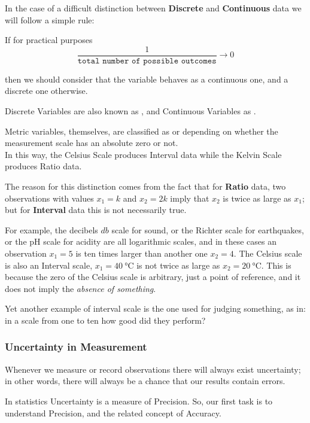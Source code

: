 In the case of a difficult distinction between \textbf{Discrete} and \textbf{Continuous} data we will follow a simple rule:

If for practical purposes
\begin{equation}
    \frac{1}{\texttt{total number of possible outcomes}}\to 0
\end{equation}

then we should consider that the variable behaves as a continuous one, and a discrete one otherwise.

Discrete Variables are also known as , and Continuous Variables as .\vspace{0.5cm}

Metric variables, themselves, are classified as  or  depending on whether the measurement scale has an absolute zero or not. \\ In this way, the Celsius Scale produces Interval data while the Kelvin Scale produces Ratio data.

The reason for this distinction comes from the fact that for \textbf{Ratio} data, two observations with values \(x_1=k\) and \(x_2=2k\) imply that \(x_2\) is twice as large as \(x_1\); but for \textbf{Interval} data this is not necessarily true. 

For example, the decibels \(db\) scale for sound, or the Richter scale for earthquakes, or the pH scale for acidity are all logarithmic scales, and in these cases an observation \(x_1=5\) is ten times larger than another one \(x_2=4\). The Celsius scale is also an Interval scale, \ie \(x_1=\SI{40}{\celsius}\) is not twice as large as \(x_2=\SI{20}{\celsius}\). This is because the zero of the Celsius scale is arbitrary, just a point of reference, and it does not imply the \textit{absence of something}.

Yet another example of interval scale is the one used for judging something, as in: in a scale from one to ten how good did they perform?

 
\newpage
\subsubsection{Uncertainty in Measurement}
Whenever we measure or record observations there will always exist uncertainty; in other words, there will always be a chance that our results contain errors.

\noindent In statistics Uncertainty is a measure of Precision. So, our first task is to understand Precision, and the related concept of Accuracy.

